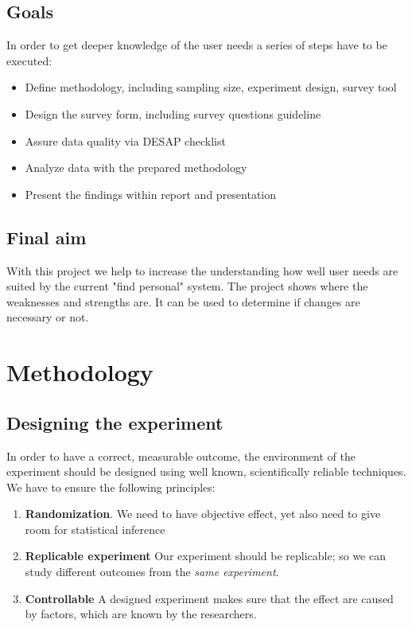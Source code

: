 \documentclass[12pt,a4paper,paper=a4,oneside,titlepage,pdftex]{scrartcl}
\begin{document}
\subsection{Goals}
In order to get deeper knowledge of the user needs a series of steps have to be executed:
\begin{itemize}
	\item Define methodology, including sampling size, experiment design, survey tool
	\item Design the survey form, including survey questions guideline
	\item Assure data quality via DESAP checklist
	\item Analyze data with the prepared methodology
	\item Present the findings within report and presentation
\end{itemize}

\subsection{Final aim}
With this project we help to increase the understanding how well user needs are suited by the current "find personal" system. The project shows where the weaknesses and strengths are. It can be used to determine if changes are necessary or not.

\section{Methodology}

\subsection{Designing the experiment}
In order to have a correct, measurable outcome, the environment of the experiment should be designed using well known, scientifically reliable techniques. We have to ensure the following principles:
\begin{enumerate}
\item \textbf{Randomization}.  We need to have objective effect, yet also need to give room for statistical inference
\item\textbf{Replicable experiment} Our experiment should be replicable; so we can study different outcomes from the \textit{same experiment}.
\item \textbf{Controllable} A designed experiment makes sure that the effect are caused by factors, which are known by the researchers.
\end{enumerate}
\end{document}
